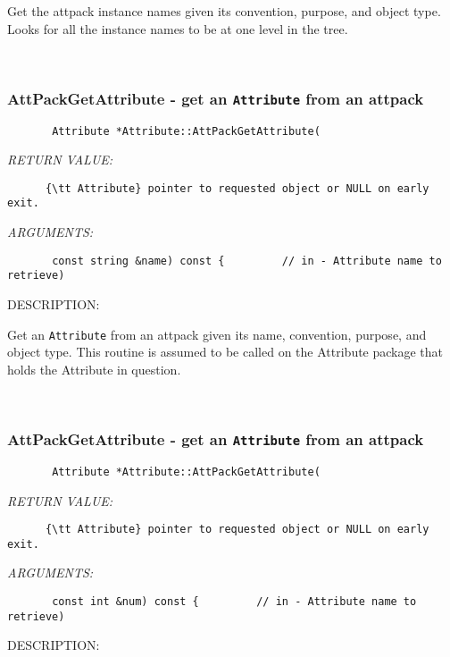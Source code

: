       Get the attpack instance names given its convention, 
      purpose, and object type.  Looks for all the instance names to be 
      at one level in the tree.
   
 
\mbox{}\hrulefill\
 
\subsubsection [AttPackGetAttribute] {AttPackGetAttribute - get an {\tt Attribute} from an attpack}


  
\begin{verbatim}       Attribute *Attribute::AttPackGetAttribute(
   \end{verbatim}{\em RETURN VALUE:}
\begin{verbatim}      {\tt Attribute} pointer to requested object or NULL on early exit.
   \end{verbatim}{\em ARGUMENTS:}
\begin{verbatim}       const string &name) const {         // in - Attribute name to retrieve)
   \end{verbatim}
{\sf DESCRIPTION:\\ }


       Get an {\tt Attribute} from an attpack given its name, convention, 
       purpose, and object type.  This routine is assumed to be called on the 
       Attribute package that holds the Attribute in question.
   
 
\mbox{}\hrulefill\
 
\subsubsection [AttPackGetAttribute] {AttPackGetAttribute - get an {\tt Attribute} from an attpack}


  
\begin{verbatim}       Attribute *Attribute::AttPackGetAttribute(\end{verbatim}{\em RETURN VALUE:}
\begin{verbatim}      {\tt Attribute} pointer to requested object or NULL on early exit.\end{verbatim}{\em ARGUMENTS:}
\begin{verbatim}       const int &num) const {         // in - Attribute name to retrieve)\end{verbatim}
{\sf DESCRIPTION:\\ }


